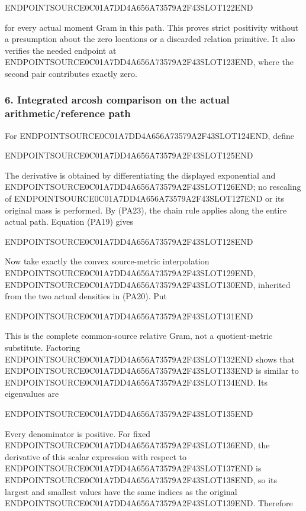 ENDPOINTSOURCE0C01A7DD4A656A73579A2F43SLOT122END

for every actual moment Gram in this path. This proves strict positivity without a presumption about the zero locations or a discarded relation primitive. It also verifies the needed endpoint at ENDPOINTSOURCE0C01A7DD4A656A73579A2F43SLOT123END, where the second pair contributes exactly zero.

\subsubsection{6. Integrated arcosh comparison on the actual arithmetic/reference path}\label{endpoint-principal_angle_volume_review--integrated-arcosh-comparison-on-the-actual-arithmeticreference-path}

For ENDPOINTSOURCE0C01A7DD4A656A73579A2F43SLOT124END, define

ENDPOINTSOURCE0C01A7DD4A656A73579A2F43SLOT125END

The derivative is obtained by differentiating the displayed exponential and ENDPOINTSOURCE0C01A7DD4A656A73579A2F43SLOT126END; no rescaling of ENDPOINTSOURCE0C01A7DD4A656A73579A2F43SLOT127END or its original mass is performed. By (PA23), the chain rule applies along the entire actual path. Equation (PA19) gives

ENDPOINTSOURCE0C01A7DD4A656A73579A2F43SLOT128END

Now take exactly the convex source-metric interpolation ENDPOINTSOURCE0C01A7DD4A656A73579A2F43SLOT129END, ENDPOINTSOURCE0C01A7DD4A656A73579A2F43SLOT130END, inherited from the two actual densities in (PA20). Put

ENDPOINTSOURCE0C01A7DD4A656A73579A2F43SLOT131END

This is the complete common-source relative Gram, not a quotient-metric substitute. Factoring ENDPOINTSOURCE0C01A7DD4A656A73579A2F43SLOT132END shows that ENDPOINTSOURCE0C01A7DD4A656A73579A2F43SLOT133END is similar to ENDPOINTSOURCE0C01A7DD4A656A73579A2F43SLOT134END. Its eigenvalues are

ENDPOINTSOURCE0C01A7DD4A656A73579A2F43SLOT135END

Every denominator is positive. For fixed ENDPOINTSOURCE0C01A7DD4A656A73579A2F43SLOT136END, the derivative of this scalar expression with respect to ENDPOINTSOURCE0C01A7DD4A656A73579A2F43SLOT137END is ENDPOINTSOURCE0C01A7DD4A656A73579A2F43SLOT138END, so its largest and smallest values have the same indices as the original ENDPOINTSOURCE0C01A7DD4A656A73579A2F43SLOT139END. Therefore

